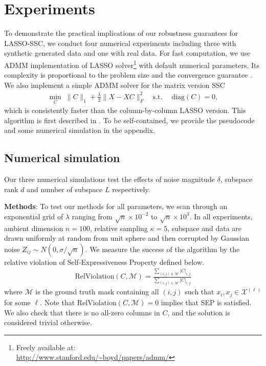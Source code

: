 \documentclass[twoside,11pt]{article}
\numberwithin{equation}{section}
\begin{document}
\section{Experiments}\label{sec:experiments}
To demonstrate the practical implications of our robustness guarantees for LASSO-SSC, we conduct four numerical experiments including three with synthetic generated data and one with real data. For fast computation, we use ADMM implementation of LASSO solver\footnote{Freely available at:\\
\href{http://www.stanford.edu/~boyd/papers/admm/}{http://www.stanford.edu/{\textasciitilde}boyd/papers/admm/}} with default numerical parameters. Its complexity is proportional to the problem size and the convergence guarantee \citep{boyd2011admm}. We also implement a simple ADMM solver for the matrix version SSC
\begin{equation}\label{eq:MatrixLasso}
\begin{aligned}
\min_{C} \; \|C\|_1+\frac{\lambda}{2}\|X-XC\|_F^2 \quad
\text{s.t.} \;\quad\mathrm{diag}(C)=0,
\end{aligned}
\end{equation}
which is consistently faster than the column-by-column LASSO version. This algorithm is first described in \citet{elhamifar2012ssc_journal}. To be self-contained, we   provide the pseudocode and some numerical simulation in the appendix.


\subsection{Numerical simulation}
Our three numerical simulations test the effects of noise magnitude $\delta$, subspace rank $d$ and number of subspace $L$ respectively.

\textbf{Methods}:
 To test our methods for all parameters, we scan through an exponential grid of $\lambda$ ranging from $\sqrt{n}\times 10^{-2}$ to $\sqrt{n}\times10^3$. In all experiments, ambient dimension $n=100$, relative sampling $\kappa=5$, subspace and data are drawn uniformly at random from unit sphere and then corrupted by Gaussian noise $Z_{ij}\sim N(0,\sigma/\sqrt{n})$. We measure the success of the algorithm by the relative violation of Self-Expressiveness Property defined below.
\begin{align*}
\mathrm{RelViolation}\left(C,\mathcal{M}\right)= \frac{\sum_{(i,j)\notin \mathcal{M}}|C|_{i,j}}{\sum_{(i,j)\in \mathcal{M}}|C|_{i,j}}
\end{align*}
where $\mathcal{M}$ is the ground truth mask containing all $(i,j)$ such that $x_i, x_j \in \mathcal{X}^{(\ell)}$ for some $\ell$. Note that $\mathrm{RelViolation}\left(C,\mathcal{M}\right)=0$ implies that SEP is satisfied. We also check that there is no all-zero columns in $C$, and the solution is considered trivial otherwise.
\end{document}
